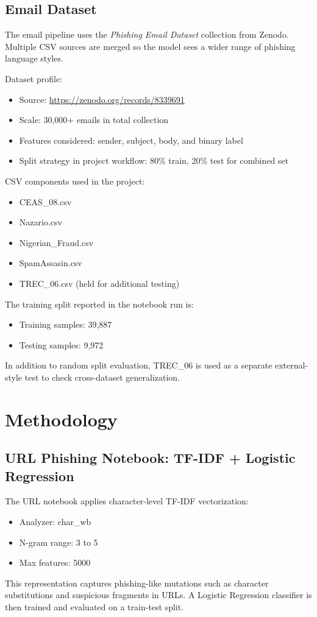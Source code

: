 \documentclass[12pt]{article}
\begin{document}
\subsection{Email Dataset}
The email pipeline uses the \textit{Phishing Email Dataset} collection from Zenodo. Multiple CSV sources are merged so the model sees a wider range of phishing language styles.

\noindent Dataset profile:
\begin{itemize}
    \item Source: \url{https://zenodo.org/records/8339691}
    \item Scale: 30,000+ emails in total collection
    \item Features considered: sender, subject, body, and binary label
    \item Split strategy in project workflow: 80\% train, 20\% test for combined set
\end{itemize}

\noindent CSV components used in the project:
\begin{itemize}
    \item CEAS\_08.csv
    \item Nazario.csv
    \item Nigerian\_Fraud.csv
    \item SpamAssasin.csv
    \item TREC\_06.csv (held for additional testing)
\end{itemize}

\noindent The training split reported in the notebook run is:
\begin{itemize}
    \item Training samples: 39,887
    \item Testing samples: 9,972
\end{itemize}

In addition to random split evaluation, TREC\_06 is used as a separate external-style test to check cross-dataset generalization.

\section{Methodology}
\subsection{URL Phishing Notebook: TF-IDF + Logistic Regression}
The URL notebook applies character-level TF-IDF vectorization:
\begin{itemize}
    \item Analyzer: char\_wb
    \item N-gram range: 3 to 5
    \item Max features: 5000
\end{itemize}
This representation captures phishing-like mutations such as character substitutions and suspicious fragments in URLs. A Logistic Regression classifier is then trained and evaluated on a train-test split.
\end{document}
